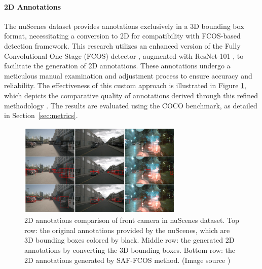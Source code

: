 \documentclass[report.tex]{subfiles}
\begin{document}
    \paragraph*{2D Annotations}

    The nuScenes dataset provides annotations exclusively in a 3D bounding box format, necessitating a conversion to 2D for compatibility with FCOS-based detection framework. This research utilizes an enhanced version of the Fully Convolutional One-Stage (FCOS) detector \cite{tian2019fcos}, augmented with ResNet-101 \cite{he2016deep}, to facilitate the generation of 2D annotations. These annotations undergo a meticulous manual examination and adjustment process to ensure accuracy and reliability. The effectiveness of this custom approach is illustrated in Figure \ref{fig:saffcos_annotations}, which depicts the comparative quality of annotations derived through this refined methodology \cite{chang2020spatial}. The results are evaluated using the COCO benchmark, as detailed in Section~\ref{sec:metrics}.

    \begin{figure}[h]
        \centering
        \includegraphics[width=0.7\textwidth]{images/methods/saf_fcos/annotations of front camera in nuScenes dataset.png}
        \caption{2D annotations comparison of front camera in nuScenes dataset. Top row: the original annotations provided by the nuScenes, which are 3D bounding boxes colored by black. Middle row: the generated 2D annotations by converting the 3D bounding boxes. Bottom row: the 2D annotations generated by SAF-FCOS method. (Image source \cite{chang2020spatial})}
        \label{fig:saffcos_annotations}
    \end{figure}

\end{document}
